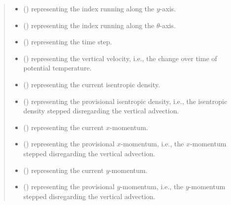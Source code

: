 \documentclass[letterpaper,10pt,english]{sphinxmanual}
\begin{document}
\begin{fulllineitems}
\begin{fulllineitems}
\begin{quote}
\begin{description}
\begin{itemize}
\item {} 
 () \textendash{}  representing the index running along the \(y\)-axis.

\item {} 
 () \textendash{}  representing the index running along the \(\theta\)-axis.

\item {} 
 () \textendash{}  representing the time step.

\item {} 
 () \textendash{}  representing the vertical velocity, i.e., the change over time of potential temperature.

\item {} 
 () \textendash{}  representing the current isentropic density.

\item {} 
 () \textendash{}  representing the provisional isentropic density, i.e., the isentropic density stepped
disregarding the vertical advection.

\item {} 
 () \textendash{}  representing the current \(x\)-momentum.

\item {} 
 () \textendash{}  representing the provisional \(x\)-momentum, i.e., the \(x\)-momentum stepped
disregarding the vertical advection.

\item {} 
 () \textendash{}  representing the current \(y\)-momentum.

\item {} 
 () \textendash{}  representing the provisional \(y\)-momentum, i.e., the \(y\)-momentum stepped
disregarding the vertical advection.


\end{itemize}
\end{description}
\end{quote}
\end{fulllineitems}
\end{fulllineitems}
\end{document}
